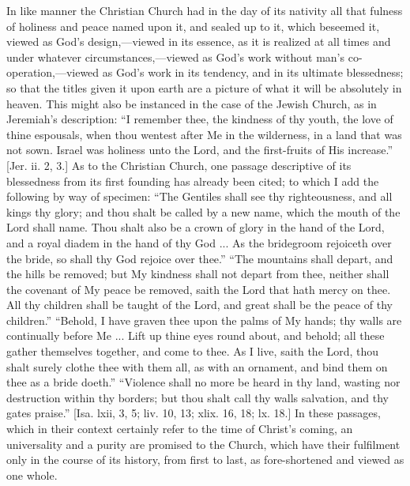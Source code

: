 In like manner the Christian Church had in the day of its nativity
all that fulness of holiness and peace named upon it, and sealed up to
it, which beseemed it, viewed as God's design,—viewed in its
essence, as it is realized at all times and under whatever
circumstances,—viewed as God's work without man's co-operation,—viewed
as God's work in its tendency, and in its ultimate blessedness; so
that the titles given it upon earth are a picture of what it will be
absolutely in heaven. This might also be instanced in the case of the
Jewish Church, as in Jeremiah's description: ``I remember thee,
the kindness of thy youth, the love of thine espousals, when thou
wentest after Me in the wilderness, in a land that was not sown.
Israel was holiness unto the Lord, and the first-fruits of His
increase.'' [Jer. ii. 2, 3.] As to the Christian Church, one
passage descriptive of its blessedness from its first founding has
already been cited; to which I add the following by way of specimen:
``The Gentiles shall see thy righteousness, and all kings thy
glory; and thou shalt be called by a new name, which the mouth of the
Lord shall name. Thou shalt also be a crown of glory in the hand of
the Lord, and a royal diadem in the hand of thy God ... As the
bridegroom rejoiceth over the bride, so shall thy God rejoice over
thee.'' ``The mountains shall depart, and the hills be
removed; but My kindness shall not depart from thee, neither shall the
covenant of My peace be removed, saith the Lord that hath mercy on
thee. All thy children shall be taught of the Lord, and great shall be
the peace of thy children.'' ``Behold, I have graven thee upon
the palms of My hands; thy walls are continually before Me ... Lift up
thine eyes round about, and behold; all these gather themselves
together, and come to thee. As I live, saith the Lord, thou shalt
surely clothe thee with them all, as with an ornament, and bind them
on thee as a bride doeth.'' ``Violence shall no more be heard
in thy land, wasting nor destruction within thy borders; but thou
shalt call thy walls salvation, and thy gates praise.'' [Isa. lxii,
3, 5; liv. 10, 13; xlix. 16, 18; lx. 18.] In these passages, which in
their context certainly refer to the time of Christ's coming, an
universality and a purity are promised to the Church, which have their
fulfilment only in the course of its history, from first to last, as
fore-shortened and viewed as one whole.

